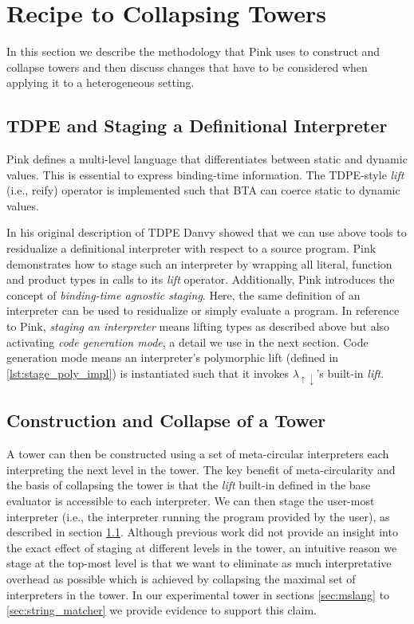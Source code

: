 \documentclass[a4paper,12pt,twoside,openright]{report}
\theoremstyle{definition}
\newcommand{\mslang}{$\lambda_{\uparrow\downarrow}$}
\begin{document}
\section{Recipe to Collapsing Towers}\label{sec:recipe}
In this section we describe the methodology that Pink uses to construct and collapse towers and then discuss changes that have to be considered when applying it to a heterogeneous setting.

\subsection{TDPE and Staging a Definitional Interpreter}\label{subsec:stage_def_interp}
Pink defines a multi-level language that differentiates between static and dynamic values. This is essential to express binding-time information. The TDPE-style \textit{lift} (i.e., reify) operator is implemented such that BTA can coerce static to dynamic values.

In his original description of TDPE  Danvy \cite{danvy1999type} showed that we can use above tools to residualize a definitional interpreter with respect to a source program. Pink demonstrates how to stage such an interpreter by wrapping all literal, function and product types in calls to its \textit{lift} operator. Additionally, Pink introduces the concept of \textit{binding-time agnostic staging}. Here, the same definition of an interpreter can be used to residualize or simply evaluate a program. In reference to Pink, \textit{staging an interpreter} means lifting types as described above but also activating \textit{code generation mode}, a detail we use in the next section. Code generation mode means an interpreter's polymorphic lift (defined in \ref{lst:stage_poly_impl}) is instantiated such that it invokes \mslang's built-in \textit{lift}.

\subsection{Construction and Collapse of a Tower}
A tower can then be constructed using a set of meta-circular interpreters each interpreting the next level in the tower. The key benefit of meta-circularity and the basis of collapsing the tower is that the \textit{lift} built-in defined in the base evaluator is accessible to each interpreter. We can then stage the user-most interpreter (i.e., the interpreter running the program provided by the user), as described in section \ref{subsec:stage_def_interp}. Although previous work did not provide an insight into the exact effect of staging at different levels in the tower, an intuitive reason we stage at the top-most level is that we want to eliminate as much interpretative overhead as possible which is achieved by collapsing the maximal set of interpreters in the tower. In our experimental tower in sections \ref{sec:mslang} to \ref{sec:string_matcher} we provide evidence to support this claim.
\end{document}
